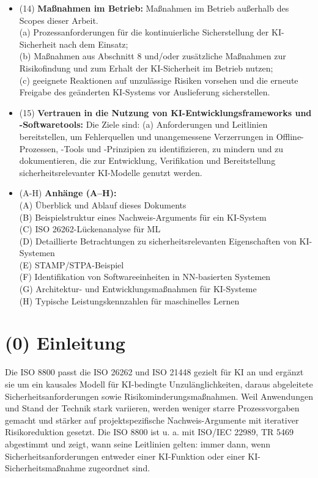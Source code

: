 \begin{itemize}
    (d) Verifikation der KI-Sicherheitsanforderungen unterstützen, durch Anpassung bzw. Neuableitung von Anforderungen zu Daten-, Entwurfs- und Test­spezifikationen.
  \item[\dotR] (14) \textbf{Maßnahmen im Betrieb:} Maßnahmen im Betrieb außerhalb des Scopes dieser Arbeit.\\ 
    (a) Prozessanforderungen für die kontinuierliche Sicherstellung der KI-Sicherheit nach dem Einsatz;\\
    (b) Maßnahmen aus Abschnitt 8 und/oder zusätzliche Maßnahmen zur Risikofindung und zum Erhalt der KI-Sicherheit im Betrieb nutzen;\\
    (c) geeignete Reaktionen auf unzulässige Risiken vorsehen und die erneute Freigabe des geänderten KI-Systems vor Auslieferung sicherstellen.
  \item[\dotY] (15) \textbf{Vertrauen in die Nutzung von KI-Entwicklungsframeworks und -Softwaretools:} Die Ziele sind:
   (a) Anforderungen und Leitlinien bereitstellen, um Fehlerquellen und unangemessene Verzerrungen in Offline-Prozessen, 
   -Tools und -Prinzipien zu identifizieren, zu mindern und zu dokumentieren, die zur Entwicklung, Verifikation und 
   Bereitstellung sicherheitsrelevanter KI-Modelle genutzt werden.
  \item[\dotY] (A-H) \textbf{Anhänge (A–H):}\\
    (A){\dotR} Überblick und Ablauf dieses Dokuments\\
    (B){\dotR} Beispielstruktur eines Nachweis-Arguments für ein KI-System\\
    (C){\dotG} ISO 26262-Lückenanalyse für ML\\
    (D){\dotG} Detaillierte Betrachtungen zu sicherheitsrelevanten Eigenschaften von KI-Systemen\\
    (E){\dotR} STAMP/STPA-Beispiel\\
    (F){\dotR} Identifikation von Softwareeinheiten in NN-basierten Systemen\\
    (G){\dotG} Architektur- und Entwicklungsmaßnahmen für KI-Systeme\\
    (H){\dotR} Typische Leistungskennzahlen für maschinelles Lernen\\
\end{itemize}




\section{(0) Einleitung}
Die ISO 8800 passt die ISO 26262 und ISO 21448 gezielt für KI an und ergänzt sie um ein 
kausales Modell für KI-bedingte Unzulänglichkeiten, daraus abgeleitete Sicherheitsanforderungen sowie 
Risikominderungs­maßnahmen. Weil Anwendungen und Stand der Technik stark variieren, werden weniger starre 
Prozessvorgaben gemacht und stärker auf projekt­spezifische Nachweis-Argumente mit iterativer Risikoreduktion 
gesetzt. Die ISO 8800 ist u. a. mit ISO/IEC 22989, TR 5469 abgestimmt und zeigt, wann seine Leitlinien gelten: immer 
dann, wenn Sicherheitsanforderungen entweder einer KI-Funktion oder einer KI-Sicherheitsmaßnahme zugeordnet sind.

